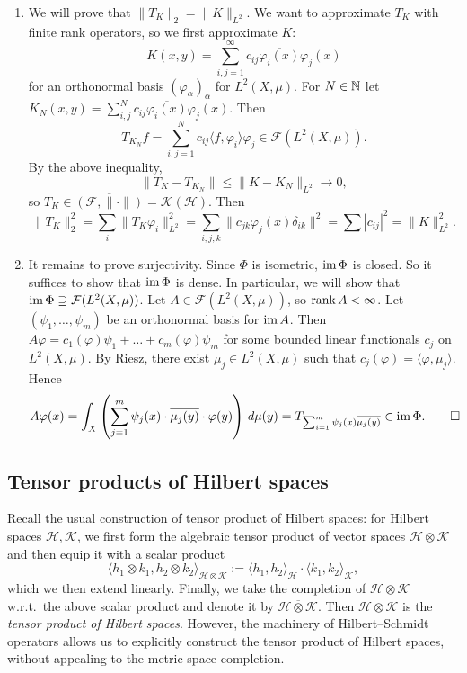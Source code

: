 \begin{myproof}
  \begin{enumerate}
    \item We will prove that $\| T_K\|_2 = \| K\|_{L^2}$.
    We want to approximate $T_K$ with finite rank operators, so we first approximate $K$:
    $$K (x, y) = \sum_{i, j = 1} ^\infty c_{ij} \overline{\varphi_{i} (x)} \varphi_j (x)$$
    for an orthonormal basis $(\varphi_\alpha)_{\alpha}$ for $L^2 (X, \mu)$.
    For $N \in \mathbb {N}$ let $K_{N} (x, y) = \sum_{i, j} ^N c_{ij} \overline{\varphi_i (x)} \varphi_j (x)$.
    Then 
    $$T_{K_N} f = \sum_{i, j = 1} ^N c_{ij} \langle f, \varphi_i\rangle \varphi_j \in \mathcal{F} (L^2 (X, \mu)).$$
    By the above inequality, 
    $$\| T_K - T_{K_N}\| \leq \| K - K_N\|_{L^2} \to 0,$$
    so $T_K \in \overline{(\mathcal{F}, \| \cdot\|)} = \mathcal{K} (\mathcal{H})$.
    Then $$\| T_K \|^2 _2 = \sum_i \| T_K \varphi_i \|_{L^2} ^2 = \sum_{i, j, k} \| c_{jk} \varphi_j (x) \delta_{ik} \|^2 = \sum |c_{ij}|^2 = \|K \|_{L^2} ^2.$$
    \item It remains to prove surjectivity. Since $\Phi$ is isometric, $\operatorname{im} \Phi$ is closed.
    So it suffices to show that $\operatorname{im} \Phi$ is dense. In particular, we will show that $\operatorname{im} \Phi \supseteq \mathcal{F} (L^2 (X, \mu))$.
    Let $A \in \mathcal{F} (L^2 (X, \mu))$, so $\operatorname{rank} A < \infty$. Let $(\psi_1, \dots, \psi_m)$ be an orthonormal basis for $\operatorname{im} A$.
    Then $A \varphi = c_1 (\varphi) \psi_1 + \dots + c_m (\varphi) \psi_m$ for some bounded linear functionals $c_j$ on $L^2 (X, \mu)$.
    By Riesz, there exist $\mu_j \in L^2 (X, \mu)$ such that $c_j (\varphi) = \langle \varphi, \mu_j \rangle$.
    Hence \begin{equation*}
      A \varphi(x) = \int_X \left(\sum_{j = 1} ^m \psi_j (x) \cdot \overline{\mu_j (y)} \cdot \varphi (y)\right)\, d\mu (y) = T_{\sum_{i = 1} ^m \psi_j (x) \overline{\mu_j (y)}} \in \operatorname{im} \Phi. \qedhere 
    \end{equation*}
  \end{enumerate}
\end{myproof}

\subsection{Tensor products of Hilbert spaces}

Recall the usual construction of tensor product of Hilbert spaces: for Hilbert spaces 
$\mathcal{H}, \mathcal{K}$, we first form the algebraic tensor product of vector spaces $\mathcal{H} \otimes \mathcal{K}$
and then equip it with a scalar product 
$$\langle h_1 \otimes k_1, h_2 \otimes k_2 \rangle_{\mathcal{H} \otimes \mathcal{K}} := \langle h_1, h_2 \rangle_{\mathcal{H}} \cdot \langle k_1, k_2 \rangle_{\mathcal{K}},$$
which we then extend linearly. Finally, we take the completion of $\mathcal{H} \otimes \mathcal{K}$ w.r.t.~the above scalar product and denote it by $\mathcal{H} \overline{\otimes} \mathcal{K}$.
Then $\mathcal{H} \otimes \mathcal{K}$ is the \emph{tensor product of Hilbert spaces}.
However, the machinery of Hilbert--Schmidt operators allows us to explicitly construct the tensor product of Hilbert spaces, 
without appealing to the metric space completion.

